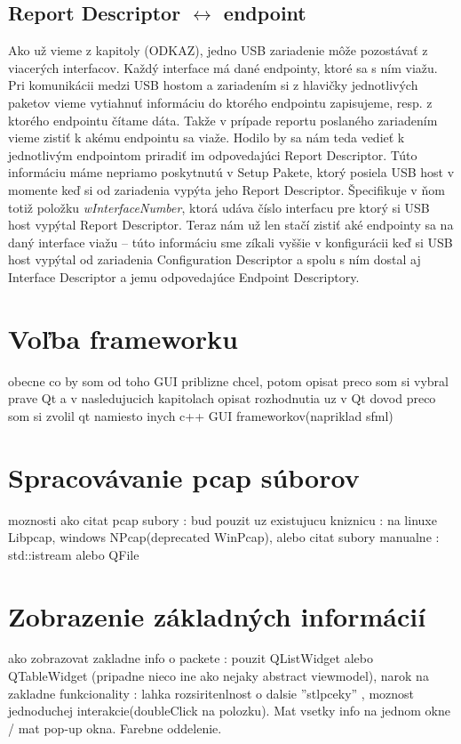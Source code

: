 \subsection{Report Descriptor $\longleftrightarrow$ endpoint}
Ako už vieme z kapitoly (ODKAZ), jedno USB zariadenie môže pozostávať z viacerých interfacov. Každý interface má dané endpointy, ktoré sa s ním viažu. Pri komunikácii medzi USB hostom a zariadením si z hlavičky jednotlivých paketov vieme vytiahnuť informáciu do ktorého endpointu zapisujeme, resp. z ktorého endpointu čítame dáta. Takže v prípade reportu poslaného zariadením vieme zistiť k akému endpointu sa viaže. Hodilo by sa nám teda vedieť k jednotlivým endpointom priradiť im odpovedajúci Report Descriptor. Túto informáciu máme nepriamo poskytnutú v Setup Pakete, ktorý posiela USB host v momente keď si od zariadenia vypýta jeho Report Descriptor. Špecifikuje v ňom totiž položku \textit{wInterfaceNumber}, ktorá udáva číslo interfacu pre ktorý si USB host vypýtal Report Descriptor. Teraz nám už len stačí zistiť aké endpointy sa na daný interface viažu -- túto informáciu sme zíkali vyššie v konfigurácii keď si USB host vypýtal od zariadenia Configuration Descriptor a spolu s ním dostal aj Interface Descriptor a jemu odpovedajúce Endpoint Descriptory.



\section{Voľba frameworku}
obecne co by som od toho GUI priblizne chcel, potom opisat preco som si vybral prave Qt a v nasledujucich kapitolach opisat rozhodnutia uz v Qt
dovod preco som si zvolil qt namiesto inych c++ GUI frameworkov(napriklad sfml)


\section{Spracovávanie pcap súborov}
moznosti ako citat pcap subory : bud pouzit uz existujucu kniznicu : na linuxe Libpcap, windows NPcap(deprecated WinPcap), alebo citat subory manualne : std::istream alebo QFile
\section{Zobrazenie základných informácií}
ako zobrazovat zakladne info o packete : pouzit QListWidget alebo QTableWidget (pripadne nieco ine ako nejaky abstract viewmodel), narok na zakladne funkcionality : lahka rozsiritenlnost o dalsie ''stlpceky'' , moznost jednoduchej interakcie(doubleClick na polozku). Mat vsetky info na jednom okne / mat pop-up okna. Farebne oddelenie.
